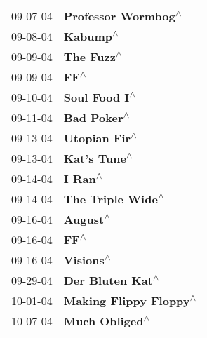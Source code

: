 \begin{supertabular}{p{0.25\columnwidth}p{0.75\columnwidth}}
 09-07-04 &                                                        \textbf{Professor Wormbog\textsuperscript{$\wedge$}} \\
 09-08-04 &                                                                   \textbf{Kabump\textsuperscript{$\wedge$}} \\
 09-09-04 &                                                                 \textbf{The Fuzz\textsuperscript{$\wedge$}} \\
 09-09-04 &                                                                       \textbf{FF\textsuperscript{$\wedge$}} \\
 09-10-04 &                                                              \textbf{Soul Food I\textsuperscript{$\wedge$}} \\
 09-11-04 &                                                                \textbf{Bad Poker\textsuperscript{$\wedge$}} \\
 09-13-04 &                                                              \textbf{Utopian Fir\textsuperscript{$\wedge$}} \\
 09-13-04 &                                                               \textbf{Kat's Tune\textsuperscript{$\wedge$}} \\
 09-14-04 &                                                                    \textbf{I Ran\textsuperscript{$\wedge$}} \\
 09-14-04 &                                                          \textbf{The Triple Wide\textsuperscript{$\wedge$}} \\
 09-16-04 &                                                                   \textbf{August\textsuperscript{$\wedge$}} \\
 09-16-04 &                                                                       \textbf{FF\textsuperscript{$\wedge$}} \\
 09-16-04 &                                                                  \textbf{Visions\textsuperscript{$\wedge$}} \\
 09-29-04 &                                                           \textbf{Der Bluten Kat\textsuperscript{$\wedge$}} \\
 10-01-04 &                                                     \textbf{Making Flippy Floppy\textsuperscript{$\wedge$}} \\
 10-07-04 &                                                             \textbf{Much Obliged\textsuperscript{$\wedge$}} \\

\end{supertabular}
